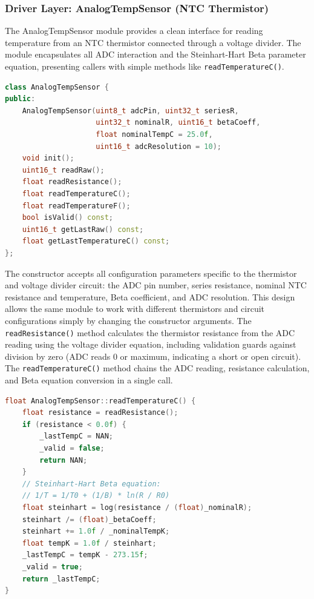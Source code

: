 \subsubsection{Driver Layer: AnalogTempSensor (NTC Thermistor)}

The AnalogTempSensor module provides a clean interface for reading temperature from an NTC thermistor connected through a voltage divider. The module encapsulates all ADC interaction and the Steinhart-Hart Beta parameter equation, presenting callers with simple methods like \texttt{readTemperatureC()}.

\begin{lstlisting}[language=C++, caption=AnalogTempSensor interface (AnalogTempSensor.h), label=lst:analog_sensor_h]
class AnalogTempSensor {
public:
    AnalogTempSensor(uint8_t adcPin, uint32_t seriesR,
                     uint32_t nominalR, uint16_t betaCoeff,
                     float nominalTempC = 25.0f,
                     uint16_t adcResolution = 10);
    void init();
    uint16_t readRaw();
    float readResistance();
    float readTemperatureC();
    float readTemperatureF();
    bool isValid() const;
    uint16_t getLastRaw() const;
    float getLastTemperatureC() const;
};
\end{lstlisting}

The constructor accepts all configuration parameters specific to the thermistor and voltage divider circuit: the ADC pin number, series resistance, nominal NTC resistance and temperature, Beta coefficient, and ADC resolution. This design allows the same module to work with different thermistors and circuit configurations simply by changing the constructor arguments. The \texttt{readResistance()} method calculates the thermistor resistance from the ADC reading using the voltage divider equation, including validation guards against division by zero (ADC reads 0 or maximum, indicating a short or open circuit). The \texttt{readTemperatureC()} method chains the ADC reading, resistance calculation, and Beta equation conversion in a single call.

\begin{lstlisting}[language=C++, caption=Key implementation --- NTC temperature conversion, label=lst:analog_sensor_convert]
float AnalogTempSensor::readTemperatureC() {
    float resistance = readResistance();
    if (resistance < 0.0f) {
        _lastTempC = NAN;
        _valid = false;
        return NAN;
    }
    // Steinhart-Hart Beta equation:
    // 1/T = 1/T0 + (1/B) * ln(R / R0)
    float steinhart = log(resistance / (float)_nominalR);
    steinhart /= (float)_betaCoeff;
    steinhart += 1.0f / _nominalTempK;
    float tempK = 1.0f / steinhart;
    _lastTempC = tempK - 273.15f;
    _valid = true;
    return _lastTempC;
}
\end{lstlisting}

